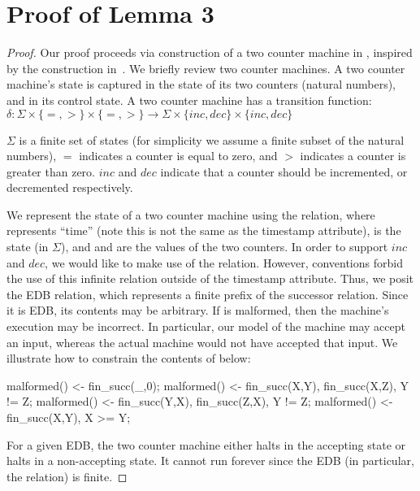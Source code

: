 \section{Proof of Lemma 3}
\begin{proof}
Our proof proceeds via construction of a two counter machine in \lang, inspired by the construction in~\cite{undecidable-datalog}. We briefly review two counter machines.  A two counter machine's state is captured in the state of its two counters (natural numbers), and in its control state.  A two counter machine has a transition function: $\delta: \Sigma \times \{=, >\} \times \{=, >\} \rightarrow \Sigma \times \{inc, dec\} \times \{inc, dec\}$

$\Sigma$ is a finite set of states (for simplicity we assume a finite subset of the natural numbers), $=$ indicates a counter is equal to zero, and $>$ indicates a counter is greater than zero.  $inc$ and $dec$ indicate that a counter should be incremented, or decremented respectively.

We represent the state of a two counter machine using the \linebreak {} relation, where  represents ``time'' (note this is not the same as the timestamp attribute),  is the state (in $\Sigma$), and  and  are the values of the two counters.  In order to support $inc$ and $dec$, we would like to make use of the  relation.  However, \lang conventions forbid the use of this infinite relation outside of the timestamp attribute.  Thus, we posit the  EDB relation, which represents a finite prefix of the successor relation.  Since it is EDB, its contents may be arbitrary.  If  is malformed, then the machine's execution may be incorrect.  In particular, our model of the machine may accept an input, whereas the actual machine would not have accepted that input.  We illustrate how to constrain the contents of  below:

\begin{Dedalus}
malformed() <- fin_succ(_,0);
malformed() <- fin_succ(X,Y), fin_succ(X,Z), Y != Z;
malformed() <- fin_succ(Y,X), fin_succ(Z,X), Y != Z;
malformed() <- fin_succ(X,Y), X >= Y;
\end{Dedalus}

For a given EDB, the two counter machine either halts in the accepting state or halts in a non-accepting state.  It cannot run forever since the EDB (in particular, the  relation) is finite.


\end{proof}
